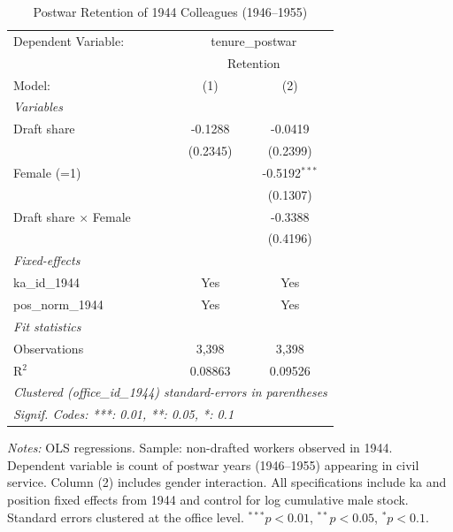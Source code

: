 \begin{table}[htbp]
\centering
\caption{Postwar Retention of 1944 Colleagues (1946--1955)}
\label{tab:retention_appendix}
\small
\begin{threeparttable}
\begingroup
\centering
\begin{tabular}{lcc}
   \tabularnewline \midrule \midrule
   Dependent Variable: & \multicolumn{2}{c}{tenure\_postwar}\\
    & \multicolumn{2}{c}{Retention} \\ 
   Model:                       & (1)      & (2)\\  
   \midrule
   \emph{Variables}\\
   Draft share                  & -0.1288  & -0.0419\\   
                                & (0.2345) & (0.2399)\\   
   Female (=1)                  &          & -0.5192$^{***}$\\   
                                &          & (0.1307)\\   
   Draft share $\times$ Female  &          & -0.3388\\   
                                &          & (0.4196)\\   
   \midrule
   \emph{Fixed-effects}\\
   ka\_id\_1944                 & Yes      & Yes\\  
   pos\_norm\_1944              & Yes      & Yes\\  
   \midrule
   \emph{Fit statistics}\\
   Observations                 & 3,398    & 3,398\\  
   R$^2$                        & 0.08863  & 0.09526\\  
   \midrule \midrule
   \multicolumn{3}{l}{\emph{Clustered (office\_id\_1944) standard-errors in parentheses}}\\
   \multicolumn{3}{l}{\emph{Signif. Codes: ***: 0.01, **: 0.05, *: 0.1}}\\
\end{tabular}
\par\endgroup
\begin{tablenotes}[flushleft]
\footnotesize
\item \textit{Notes:} OLS regressions. Sample: non-drafted workers observed in 1944. Dependent variable is count of postwar years (1946--1955) appearing in civil service. Column (2) includes gender interaction. All specifications include ka and position fixed effects from 1944 and control for log cumulative male stock. Standard errors clustered at the office level. $^{***}p<0.01$, $^{**}p<0.05$, $^{*}p<0.1$.
\end{tablenotes}
\end{threeparttable}
\end{table}
